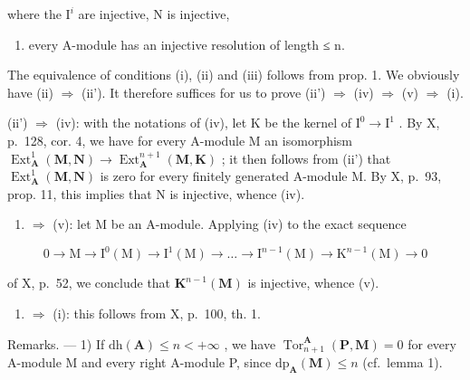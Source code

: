 where the \(\mathrm{I}^{i}\) are injective, N is injective,

\begin{enumerate}
\def\labelenumi{(\alph{enumi})}
\setcounter{enumi}{21}
\tightlist
\item
  every A-module has an injective resolution of length ≤ n.
\end{enumerate}

The equivalence of conditions (i), (ii) and (iii) follows from prop. 1. We obviously have (ii) \(\Rightarrow\) (ii'). It therefore suffices for us to prove (ii') \(\Rightarrow\) (iv) \(\Rightarrow\) (v) \(\Rightarrow\) (i).

(ii') \(\Rightarrow\) (iv): with the notations of (iv), let K be the kernel of \(\mathrm{I}^{0} \to \mathrm{I}^{1}\) . By X, p.~128, cor. 4, we have for every A-module M an isomorphism \(\operatorname{Ext}_{\mathbf{A}}^{1}(\mathbf{M}, \mathbf{N}) \to \operatorname{Ext}_{\mathbf{A}}^{n+1}(\mathbf{M}, \mathbf{K})\) ; it then follows from (ii') that \(\operatorname{Ext}_{\mathbf{A}}^{1}(\mathbf{M}, \mathbf{N})\) is zero for every finitely generated A-module M. By X, p.~93, prop. 11, this implies that N is injective, whence (iv).

\begin{enumerate}
\def\labelenumi{(\roman{enumi})}
\setcounter{enumi}{3}
\tightlist
\item
  \(\Rightarrow\) (v): let M be an A-module. Applying (iv) to the exact sequence
\end{enumerate}

\[
0 \rightarrow \mathrm{M} \rightarrow \mathrm{I} ^ {0} (\mathrm{M}) \rightarrow \mathrm{I} ^ {1} (\mathrm{M}) \rightarrow \dots \rightarrow \mathrm{I} ^ {n - 1} (\mathrm{M}) \rightarrow \mathrm{K} ^ {n - 1} (\mathrm{M}) \rightarrow 0
\]

of X, p.~52, we conclude that \(\mathbf{K}^{n-1}(\mathbf{M})\) is injective, whence (v).

\begin{enumerate}
\def\labelenumi{(\alph{enumi})}
\setcounter{enumi}{21}
\tightlist
\item
  \(\Rightarrow\) (i): this follows from X, p.~100, th. 1.
\end{enumerate}

Remarks. --- 1) If \(\mathrm{dh}(\mathbf{A}) \leqslant n < +\infty\) , we have \(\operatorname{Tor}_{n+1}^{\mathbf{A}}(\mathbf{P}, \mathbf{M}) = 0\) for every A-module M and every right A-module P, since \(\mathrm{dp}_{\mathbf{A}}(\mathbf{M}) \leqslant n\) (cf.~lemma 1).

